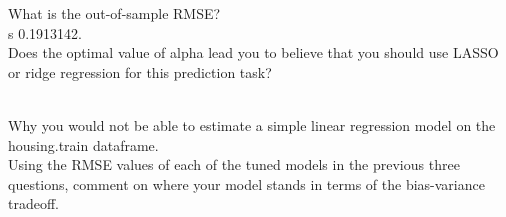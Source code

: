 \documentclass{article}
\begin{document}
What is the out-of-sample RMSE?\\
s 0.1913142.\\

Does the optimal value of alpha lead you to believe that you should use LASSO or ridge regression for this prediction task?\\

\newline

\\
Why you would not be able to estimate a simple linear regression model on the housing.train dataframe.\\


Using the RMSE values of each of the tuned models in the previous three questions, comment on where your model stands in terms of the bias-variance tradeoff.\\
\newline

\newline
\end{document}
